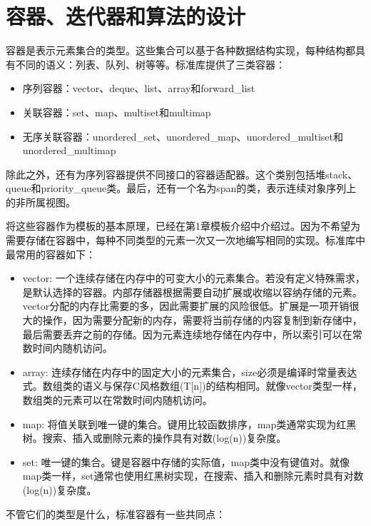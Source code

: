 \section{容器、迭代器和算法的设计}
容器是表示元素集合的类型。这些集合可以基于各种数据结构实现，每种结构都具有不同的语义：列表、队列、树等等。标准库提供了三类容器：

\begin{itemize}
\item
序列容器：vector、deque、list、array和forward\_list

\item
关联容器：set、map、multiset和multimap

\item
无序关联容器：unordered\_set、unordered\_map、unordered\_multiset和unordered\_multimap
\end{itemize}

除此之外，还有为序列容器提供不同接口的容器适配器。这个类别包括堆stack、queue和priority\_queue类。最后，还有一个名为span的类，表示连续对象序列上的非所属视图。

将这些容器作为模板的基本原理，已经在第1章模板介绍中介绍过。因为不希望为需要存储在容器中，每种不同类型的元素一次又一次地编写相同的实现。标准库中最常用的容器如下：

\begin{itemize}
\item
vector: 一个连续存储在内存中的可变大小的元素集合。若没有定义特殊需求，是默认选择的容器。内部存储器根据需要自动扩展或收缩以容纳存储的元素。vector分配的内存比需要的多，因此需要扩展的风险很低。扩展是一项开销很大的操作，因为需要分配新的内存，需要将当前存储的内容复制到新存储中，最后需要丢弃之前的存储。因为元素连续地存储在内存中，所以索引可以在常数时间内随机访问。

\item
array: 连续存储在内存中的固定大小的元素集合，size必须是编译时常量表达式。数组类的语义与保存C风格数组(T[n])的结构相同。就像vector类型一样，数组类的元素可以在常数时间内随机访问。

\item
map: 将值关联到唯一键的集合。键用比较函数排序，map类通常实现为红黑树。搜索、插入或删除元素的操作具有对数(log(n))复杂度。

\item
set: 唯一键的集合。键是容器中存储的实际值，map类中没有键值对。就像map类一样，set通常也使用红黑树实现，在搜索、插入和删除元素时具有对数(log(n))复杂度。
\end{itemize}

不管它们的类型是什么，标准容器有一些共同点：

